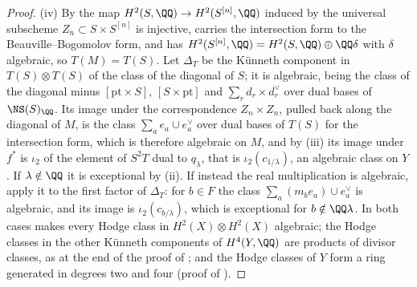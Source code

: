 \begin{proof}
(iv) By \cite{Bea83} the map $H^{2}(S,\QQ)\to H^{2}(S^{[n]},\QQ)$ induced by
the universal subscheme $Z_{n}\subset S\times S^{[n]}$ is injective, carries
the intersection form to the Beauville--Bogomolov form, and has
$H^{2}(S^{[n]},\QQ)=H^{2}(S,\QQ)\oplus\QQ\delta$ with $\delta$ algebraic, so
$T(M)=T(S)$. Let $\Delta_{T}$ be the K\"unneth component in $T(S)\otimes
T(S)$ of the class of the diagonal of $S$; it is algebraic, being the class
of the diagonal minus $[\mathrm{pt}\times S]$, $[S\times\mathrm{pt}]$ and
$\sum_{r}d_{r}\times d_{r}^{\vee}$ over dual bases of $\NS(S)_{\QQ}$. Its image
under the correspondence $Z_{n}\times Z_{n}$, pulled back along the diagonal
of $M$, is the class $\sum_{a}e_{a}\cup e_{a}^{\vee}$ over dual bases of
$T(S)$ for the intersection form, which is therefore algebraic on $M$, and by
(iii) its image under $f^{*}$ is $\iota_{2}$ of the element of $S^{2}T$ dual
to $q_{\lambda}$, that is $\iota_{2}(c_{1/\lambda})$, an algebraic class on
$Y$. If $\lambda\notin\QQ$ it is exceptional by (ii). If instead the real
multiplication is algebraic, apply it to the first factor of $\Delta_{T}$:
for $b\in F$ the class $\sum_{a}(m_{b}e_{a})\cup e_{a}^{\vee}$ is algebraic,
and its image is $\iota_{2}(c_{b/\lambda})$, which is exceptional for
$b\notin\QQ\lambda$. In both cases  makes every
Hodge class in $H^{2}(X)\otimes H^{2}(X)$ algebraic; the Hodge classes in the
other K\"unneth components of $H^{4}(Y,\QQ)$ are products of divisor classes,
as at the end of the proof of ; and the Hodge classes of
$Y$ form a ring generated in degrees two and four (proof of
).
\end{proof}

